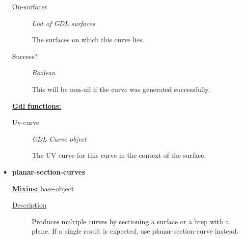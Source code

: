 \documentclass [11pt]{book}
\begin{document}
\begin{itemize}
\begin{description}
\item [On-surfaces]
\emph{List of GDL surfaces}

 The surfaces on which this curve lies.




\item [Success?]
\emph{Boolean}

 This will be non-nil if the curve was generated successfully.




\end{description}






\textbf{
\underline{Gdl functions:}}

\begin{description}

\item [Uv-curve]
\emph{GDL Curve object}

 The UV curve for this curve in the context of the surface.




\end{description}







\item {}
\label{prim:planar-section-curves}
\textbf{planar-section-curves}


\textbf{
\underline{Mixins:}} base-object





\begin{description}

\item [
\underline{Description}]


Produces multiple curves by sectioning a surface or a brep with a plane.
If a single result is expected, use planar-section-curve instead.



\end{description}




\begin{figure}
\begin{lrbox}{\boxedverb}
\begin{minipage}{\linewidth}
{\small

}
\end{minipage}
\end{lrbox}
\end{figure}
\end{itemize}
\end{document}
